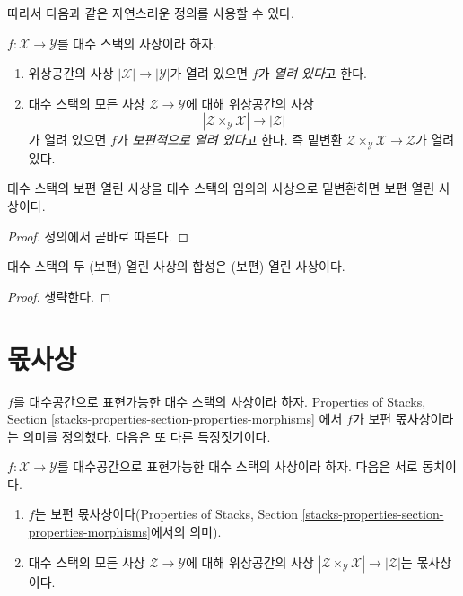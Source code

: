 \noindent
따라서 다음과 같은 자연스러운 정의를 사용할 수 있다.

\begin{definition}
\label{definition-open}
$f : \mathcal{X} \to \mathcal{Y}$를 대수 스택의 사상이라 하자.
\begin{enumerate}
\item 위상공간의 사상 $|\mathcal{X}| \to |\mathcal{Y}|$가 열려 있으면
$f$가 {\it 열려 있다}고 한다.
\item 대수 스택의 모든 사상 $\mathcal{Z} \to \mathcal{Y}$에 대해
위상공간의 사상
$$
|\mathcal{Z} \times_\mathcal{Y} \mathcal{X}| \to |\mathcal{Z}|
$$
가 열려 있으면 $f$가 {\it 보편적으로 열려 있다}고 한다. 즉 밑변환
$\mathcal{Z} \times_\mathcal{Y} \mathcal{X} \to \mathcal{Z}$가 열려 있다.
\end{enumerate}
\end{definition}

\begin{lemma}
\label{lemma-base-change-universally-open}
대수 스택의 보편 열린 사상을 대수 스택의 임의의 사상으로 밑변환하면
보편 열린 사상이다.
\end{lemma}

\begin{proof}
정의에서 곧바로 따른다.
\end{proof}

\begin{lemma}
\label{lemma-composition-universally-open}
대수 스택의 두 (보편) 열린 사상의 합성은 (보편) 열린 사상이다.
\end{lemma}

\begin{proof}
생략한다.
\end{proof}







\section{몫사상}
\label{section-submersive}

\noindent
$f$를 대수공간으로 표현가능한 대수 스택의 사상이라 하자.
Properties of Stacks, Section
\ref{stacks-properties-section-properties-morphisms}
에서 $f$가 보편 몫사상이라는 의미를 정의했다. 다음은 또 다른 특징짓기이다.

\begin{lemma}
\label{lemma-characterize-representable-universally-submersive}
$f : \mathcal{X} \to \mathcal{Y}$를 대수공간으로 표현가능한
대수 스택의 사상이라 하자. 다음은 서로 동치이다.
\begin{enumerate}
\item $f$는 보편 몫사상이다(Properties of Stacks, Section
\ref{stacks-properties-section-properties-morphisms}에서의 의미).
\item 대수 스택의 모든 사상 $\mathcal{Z} \to \mathcal{Y}$에 대해
위상공간의 사상
$|\mathcal{Z} \times_\mathcal{Y} \mathcal{X}| \to |\mathcal{Z}|$는 몫사상이다.
\end{enumerate}
\end{lemma}

